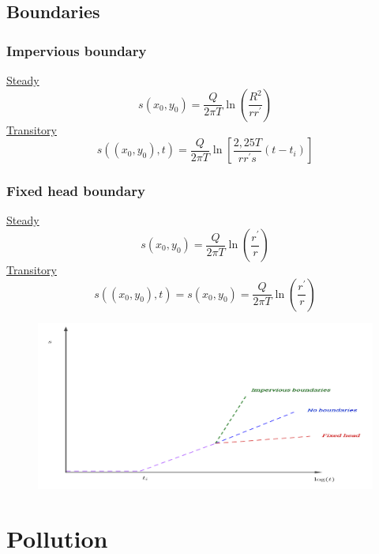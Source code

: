 \documentclass[landscape]{article}
\begin{document}
\begin{multicols*}{3}
\subsection{Boundaries} %
\label{sub:boundaries}
\subsubsection{Impervious boundary} %
\label{ssub:impervious_boundary}
\underline{Steady}
\[
  s(x_0,y_0) =  \frac{Q}{2\pi T}\ln \left(\frac{R^2}{r r^{\prime}}\right)
\]
\underline{Transitory}
\[
  s((x_0,y_0),t) =  \frac{Q}{2\pi T}\ln \left[\frac{2,25 T}{r r^{\prime}s}(t-t_i)\right]
\]
\subsubsection{Fixed head boundary} %
\label{ssub:fixed_head_boundary}
\underline{Steady}
\[
  s(x_0,y_0) =  \frac{Q}{2\pi T}\ln \left(\frac{r^{\prime}}{r}\right)
\]
\underline{Transitory}
\[
  s((x_0,y_0),t) = s(x_0,y_0)  =  \frac{Q}{2\pi T}\ln \left(\frac{r^{\prime}}{r}\right)
\]
\begin{figure}[H]
  \centering
  \includegraphics[width = 0.8\linewidth]{./img/pump_test3}
\end{figure}

\section{Pollution} %
\label{sec:pollution}

\end{multicols*}
\end{document}
